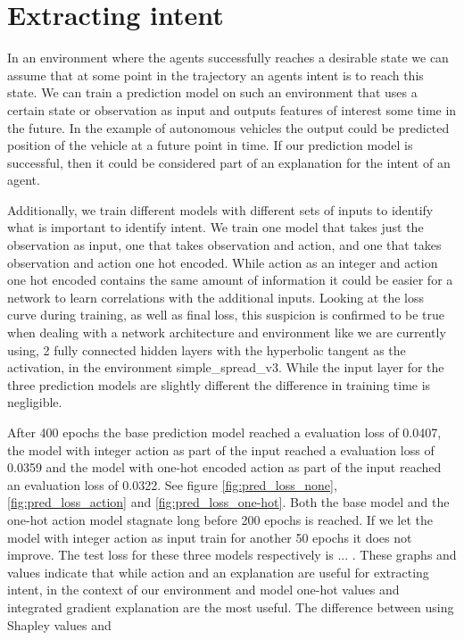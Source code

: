 \documentclass[UKenglish]{uiomasterthesis}
\begin{document}
\section{Extracting intent}
\label{sec:intent_meth}
In an environment where the agents successfully reaches a desirable state we can assume that at some point in the trajectory an agents intent is to reach this state. We can train a prediction model on such an environment that uses a certain state or observation as input and outputs features of interest some time in the future. In the example of autonomous vehicles the output could be predicted position of the vehicle at a future point in time. If our prediction model is successful, then it could be considered part of an explanation for the intent of an agent.

Additionally, we train different models with different sets of inputs to identify what is important to identify intent. We train one model that takes just the observation as input, one that takes observation and action, and one that takes observation and action one hot encoded. While action as an integer and action one hot encoded contains the same amount of information it could be easier for a network to learn correlations with the additional inputs. Looking at the loss curve during training, as well as final loss, this suspicion is confirmed to be true when dealing with a network architecture and environment like we are currently using, 2 fully connected hidden layers with the hyperbolic tangent as the activation, in the environment simple\_spread\_v3. While the input layer for the three prediction models are slightly different the difference in training time is negligible. 

After 400 epochs the base prediction model reached a evaluation loss of 0.0407, the model with integer action as part of the input reached a evaluation loss of 0.0359 and the model with one-hot encoded action as part of the input reached an evaluation loss of 0.0322. See figure \ref{fig:pred_loss_none}, \ref{fig:pred_loss_action} and \ref{fig:pred_loss_one-hot}. Both the base model and the one-hot action model stagnate long before 200 epochs is reached. If we let the model with integer action as input train for another 50 epochs it does not improve. The test loss for these three models respectively is ... . These graphs and values indicate that while action and an explanation are useful for extracting intent, in the context of our environment and model one-hot values and integrated gradient explanation are the most useful. The difference between using Shapley values and
\end{document}
